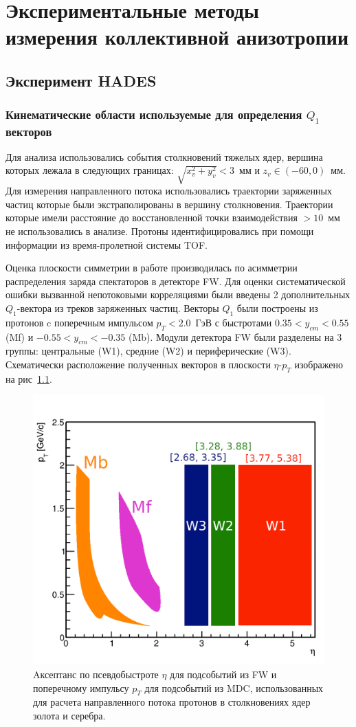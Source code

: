 \chapter{Экспериментальные методы измерения коллективной анизотропии}

\section{Эксперимент HADES}

\subsection{Кинематические области используемые для определения $Q_1$ векторов}

Для анализа использовались события столкновений тяжелых ядер, вершина которых лежала в следующих границах: $\sqrt{x_v^2+y_v^2}<3$~мм и $z_v \in (-60, 0)$~мм.
Для измерения направленного потока использовались траектории заряженных частиц которые были экстраполированы в вершину столкновения.
Траектории которые имели расстояние до восстановленной точки взаимодействия $>10$~мм не использовались в анализе.
Протоны идентифицировались при помощи информации из время-пролетной системы  TOF. 

Оценка плоскости симметрии в работе производилась по асимметрии распределения заряда спектаторов в детекторе FW. 
Для оценки систематической ошибки вызванной непотоковыми корреляциями были введены 2 дополнительных $Q_1$-вектора из треков заряженных частиц.
Векторы $Q_1$ были построены из протонов c поперечным импульсом $p_T < 2.0$~ГэВ с быстротами $0.35 < y_{cm} < 0.55$ (Mf) и $-0.55 < y_{cm} < -0.35$ (Mb).
Модули детектора FW были разделены на 3 группы: центральные (W1), средние (W2) и периферические (W3).
Схематически расположение полученных векторов в плоскости $\eta$-$p_T$ изображено на рис~\ref{fig:hades_qvectors}.
%
\begin{figure}[ht]
\begin{center}
\includegraphics[width=0.75\linewidth]{images/eta_pt_qvectors.png}
\caption{Aксептанс по псевдобыстроте $\eta$ для подсобытий из FW и поперечному импульсу $p_T$ для подсобытий из MDC, использованных для расчета направленного потока протонов в столкновениях ядер золота и серебра.}
\label{fig:hades_qvectors}
\end{center}
\end{figure}
%

